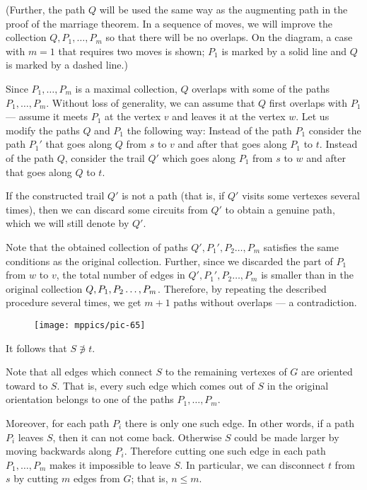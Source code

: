 (Further, the path $Q$ will be used the same way as the augmenting path in the proof of the marriage theorem.
In a sequence of moves, we will improve the collection $Q,P_1,\dots,P_m$ so that there will be no overlaps.
On the diagram, a case with $m=1$ that requires two moves is shown;
$P_1$ is marked by a solid line and $Q$ is marked by a dashed line.)

Since $P_1,\dots,P_m$ is a maximal collection, $Q$ overlaps with some of the paths $P_1,\dots,P_m$.
Without loss of generality, we can assume that $Q$ first overlaps with $P_1$ --- assume it meets $P_1$ at the vertex $v$ and leaves it at the vertex $w$.
Let us modify the paths $Q$ and $P_1$ the following way:
Instead of the path $P_1$ consider the path $P_1'$ that goes along $Q$ from $s$ to $v$ and after that goes along $P_1$ to $t$.
Instead of the path $Q$, consider the trail $Q'$ which goes along $P_1$ from $s$ to $w$ and after that goes along $Q$ to $t$.

If the constructed trail $Q'$ is not a path (that is, if $Q'$ visits some vertexes several times), then we can discard some circuits from $Q'$ to obtain a genuine path, 
which we will still denote by $Q'$.

Note that the obtained collection of paths $Q', P_1',P_2\dots,P_m$ satisfies the same conditions as the original collection.
Further, since we discarded the part of $P_1$ from $w$ to $v$, the total number of edges in $Q', P_1',P_2\dots,P_m$
is smaller than in the original collection $Q, P_1,P_2\z\dots,P_m$.
Therefore, by repeating the described procedure several times, we get $m+1$ paths without overlaps --- a contradiction.

{

\begin{wrapfigure}{o}{40 mm}
\vskip-4mm
\centering
\texttt{[image: mppics/pic-65]}
\vskip0mm
\end{wrapfigure}

It follows that $S\not\ni t$.

Note that all edges which connect $S$ to the remaining vertexes of $G$ are oriented toward to $S$.
That is, every such edge which comes out of $S$ in the original orientation belongs to one of the paths $P_1,\dots,P_m$.

}

Moreover, for each path $P_i$ there is only one such edge.
In other words, if a path $P_i$ leaves $S$, then it can not come back. 
Otherwise $S$ could be made larger by moving backwards along $P_i$.
Therefore cutting one such edge in each path $P_1,\dots,P_m$ makes it impossible to leave $S$.
In particular, we can disconnect $t$ from $s$ by cutting $m$ edges from $G$; that is, $n\le m$.
\qeds

